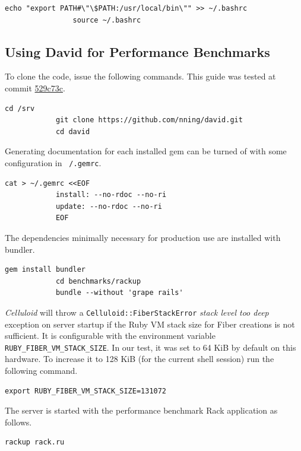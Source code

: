 			\begin{lstlisting}[gobble=8]
				echo "export PATH#\"\$PATH:/usr/local/bin\"" >> ~/.bashrc
				source ~/.bashrc
			\end{lstlisting}

	\subsection{Using David for Performance Benchmarks}

		To clone the code, issue the following commands. This guide was tested
		at commit
		\href{https://github.com/nning/david/tree/529c73cdbacc1d4c77445c72de4ebddf994bb60c}{529c73c}.

		\begin{lstlisting}[gobble=6]
			cd /srv
			git clone https://github.com/nning/david.git
			cd david
		\end{lstlisting}

		Generating documentation for each installed gem can be turned of with
		some configuration in \texttt{~/.gemrc}.

		\begin{lstlisting}[gobble=6]
			cat > ~/.gemrc <<EOF
			install: --no-rdoc --no-ri
			update: --no-rdoc --no-ri
			EOF
		\end{lstlisting}

		The dependencies minimally necessary for production use are installed
		with bundler.
			
		\begin{lstlisting}[gobble=6]
			gem install bundler
			cd benchmarks/rackup
			bundle --without 'grape rails'
		\end{lstlisting}

		\emph{Celluloid} will throw a \texttt{Celluloid::FiberStackError}
		\emph{stack level too deep} exception on server startup if the Ruby
		\ac{VM} stack size for Fiber creations is not sufficient. It is
		configurable with the environment variable
		\texttt{RUBY\_FIBER\_VM\_STACK\_SIZE}. In our test, it was set to 64
		KiB by default on this hardware. To increase it to 128 KiB (for the
		current shell session) run the following command.

		\begin{lstlisting}[gobble=6]
			export RUBY_FIBER_VM_STACK_SIZE=131072
		\end{lstlisting}

		The server is started with the performance benchmark Rack application
		as follows.

		\begin{lstlisting}[gobble=6]
			rackup rack.ru
		\end{lstlisting}

